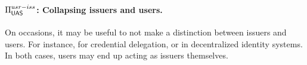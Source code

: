 \paragraph{$\Pi_{\mathsf{UAS}}^{usr-iss}$: Collapsing issuers and users.} %
On occasions, it may be useful to not make a distinction between issuers and
users. For instance, for credential delegation, or in decentralized identity
systems. In both cases, users may end up acting as issuers themselves.

